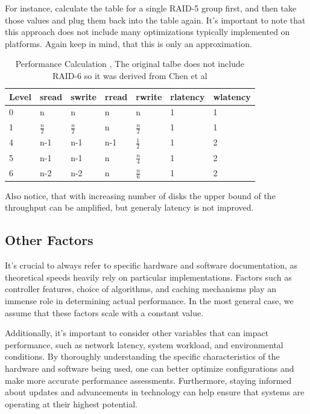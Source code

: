 \documentclass{article}
\begin{document}
For instance, calculate the table for a single RAID-5 group first,
and then take those values and plug them back into the table again.
It's important to note that this approach does not include many optimizations typically implemented on platforms.
Again keep in mind, that this is only an approximation.
\begin{table}[h]
    \begin{tabularx}{\textwidth}{l|X|X|X|X|X|X}
        \textbf{Level} &
        sread &
        swrite &
        rread &
        rwrite &
        rlatency &
        wlatency \\
        \hline
        0 & n & n & n & n & 1 & 1\\
        1 & \( \frac{n}{2}\) & \( \frac{n}{2}\) & n & \( \frac{n}{2}\) & 1 & 1\\ 
        4 & n-1 & n-1 & n-1 & \( \frac{1}{2}\) & 1 & 2 \\ 
        5 & n-1 & n-1 & n & \( \frac{n}{4}\) & 1 & 2 \\
        6 & n-2 \cite{cmu:raidhighperf}& n-2 \cite{cmu:raidhighperf}& n \cite{cmu:raidhighperf}& \( \frac{n}{6} \) \cite{cmu:raidhighperf}& 1 \cite{cmu:raidhighperf}& 2 \cite{cmu:raidhighperf}\\
       \end{tabularx}
    \caption{Performance Calculation \cite{uw:raid}, The original talbe does not include RAID-6 so it was derived from Chen et al \cite{cmu:raidhighperf}}
    \label{tab:perf}
\end{table}
Also notice, that with increasing number of disks
the upper bound of the throughput can be amplified,
but generaly latency is not improved.
\subsection{Other Factors}
It's crucial to always refer to specific hardware and software documentation,
as theoretical speeds heavily rely on particular implementations.
Factors such as controller features, choice of algorithms,
and caching mechanisms play an immense role in determining actual performance.
In the most general case, we assume that these factors scale with a constant value.

Additionally, it's important to consider other variables that can impact performance,
such as network latency, system workload, and environmental conditions.
By thoroughly understanding the specific characteristics of the hardware and software being used,
one can better optimize configurations and make more accurate performance assessments.
Furthermore, staying informed about updates and advancements in technology
can help ensure that systems are operating at their highest potential.
\pagebreak
\end{document}
